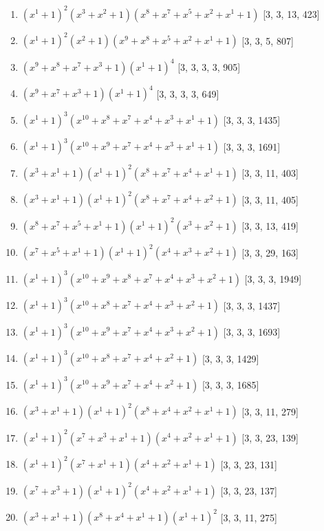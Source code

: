 \documentclass[10pt,twocolumn]{article}
\begin{document}
\begin{enumerate}
\item $(x^{1} + 1)^{2}(x^{3} + x^{2} + 1)(x^{8} + x^{7} + x^{5} + x^{2} + x^{1} + 1)$  [3, 3, 13, 423]
\item $(x^{1} + 1)^{2}(x^{2} + 1)(x^{9} + x^{8} + x^{5} + x^{2} + x^{1} + 1)$  [3, 3, 5, 807]
\item $(x^{9} + x^{8} + x^{7} + x^{3} + 1)(x^{1} + 1)^{4}$  [3, 3, 3, 3, 905]
\item $(x^{9} + x^{7} + x^{3} + 1)(x^{1} + 1)^{4}$  [3, 3, 3, 3, 649]
\item $(x^{1} + 1)^{3}(x^{10} + x^{8} + x^{7} + x^{4} + x^{3} + x^{1} + 1)$  [3, 3, 3, 1435]
\item $(x^{1} + 1)^{3}(x^{10} + x^{9} + x^{7} + x^{4} + x^{3} + x^{1} + 1)$  [3, 3, 3, 1691]
\item $(x^{3} + x^{1} + 1)(x^{1} + 1)^{2}(x^{8} + x^{7} + x^{4} + x^{1} + 1)$  [3, 3, 11, 403]
\item $(x^{3} + x^{1} + 1)(x^{1} + 1)^{2}(x^{8} + x^{7} + x^{4} + x^{2} + 1)$  [3, 3, 11, 405]
\item $(x^{8} + x^{7} + x^{5} + x^{1} + 1)(x^{1} + 1)^{2}(x^{3} + x^{2} + 1)$  [3, 3, 13, 419]
\item $(x^{7} + x^{5} + x^{1} + 1)(x^{1} + 1)^{2}(x^{4} + x^{3} + x^{2} + 1)$  [3, 3, 29, 163]
\item $(x^{1} + 1)^{3}(x^{10} + x^{9} + x^{8} + x^{7} + x^{4} + x^{3} + x^{2} + 1)$  [3, 3, 3, 1949]
\item $(x^{1} + 1)^{3}(x^{10} + x^{8} + x^{7} + x^{4} + x^{3} + x^{2} + 1)$  [3, 3, 3, 1437]
\item $(x^{1} + 1)^{3}(x^{10} + x^{9} + x^{7} + x^{4} + x^{3} + x^{2} + 1)$  [3, 3, 3, 1693]
\item $(x^{1} + 1)^{3}(x^{10} + x^{8} + x^{7} + x^{4} + x^{2} + 1)$  [3, 3, 3, 1429]
\item $(x^{1} + 1)^{3}(x^{10} + x^{9} + x^{7} + x^{4} + x^{2} + 1)$  [3, 3, 3, 1685]
\item $(x^{3} + x^{1} + 1)(x^{1} + 1)^{2}(x^{8} + x^{4} + x^{2} + x^{1} + 1)$  [3, 3, 11, 279]
\item $(x^{1} + 1)^{2}(x^{7} + x^{3} + x^{1} + 1)(x^{4} + x^{2} + x^{1} + 1)$  [3, 3, 23, 139]
\item $(x^{1} + 1)^{2}(x^{7} + x^{1} + 1)(x^{4} + x^{2} + x^{1} + 1)$  [3, 3, 23, 131]
\item $(x^{7} + x^{3} + 1)(x^{1} + 1)^{2}(x^{4} + x^{2} + x^{1} + 1)$  [3, 3, 23, 137]
\item $(x^{3} + x^{1} + 1)(x^{8} + x^{4} + x^{1} + 1)(x^{1} + 1)^{2}$  [3, 3, 11, 275]

\end{enumerate}
\end{document}
